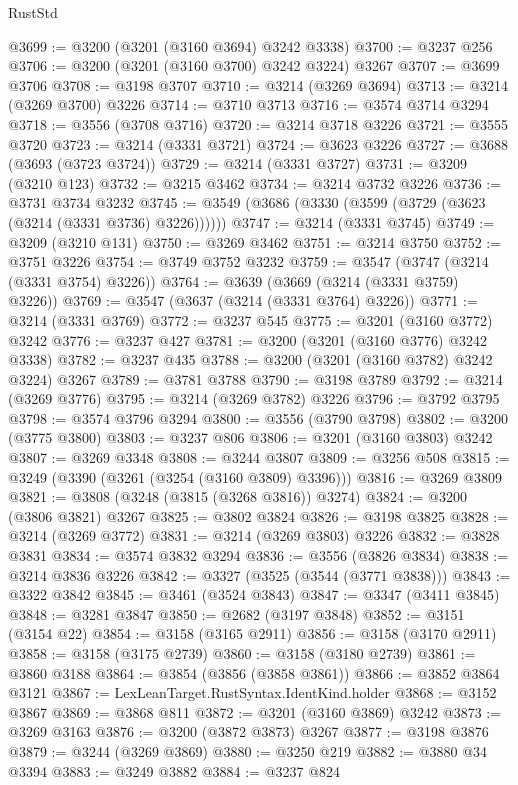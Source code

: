 \begin{lexlean}{RustStd}
\begin{coremodule}
{\begin{coremodule}
{{{{{{{{{{{{{{{{{{{{{{{{{@3699 := @3200 (@3201 (@3160 @3694) @3242 @3338)
@3700 := @3237 @256
@3706 := @3200 (@3201 (@3160 @3700) @3242 @3224) @3267
@3707 := @3699 @3706
@3708 := @3198 @3707
@3710 := @3214 (@3269 @3694)
@3713 := @3214 (@3269 @3700) @3226
@3714 := @3710 @3713
@3716 := @3574 @3714 @3294
@3718 := @3556 (@3708 @3716)
@3720 := @3214 @3718 @3226
@3721 := @3555 @3720
@3723 := @3214 (@3331 @3721)
@3724 := @3623 @3226
@3727 := @3688 (@3693 (@3723 @3724))
@3729 := @3214 (@3331 @3727)
@3731 := @3209 (@3210 @123)
@3732 := @3215 @3462
@3734 := @3214 @3732 @3226
@3736 := @3731 @3734 @3232
@3745 := @3549 (@3686 (@3330 (@3599 (@3729 (@3623 (@3214 (@3331 @3736) @3226))))))
@3747 := @3214 (@3331 @3745)
@3749 := @3209 (@3210 @131)
@3750 := @3269 @3462
@3751 := @3214 @3750
@3752 := @3751 @3226
@3754 := @3749 @3752 @3232
@3759 := @3547 (@3747 (@3214 (@3331 @3754) @3226))
@3764 := @3639 (@3669 (@3214 (@3331 @3759) @3226))
@3769 := @3547 (@3637 (@3214 (@3331 @3764) @3226))
@3771 := @3214 (@3331 @3769)
@3772 := @3237 @545
@3775 := @3201 (@3160 @3772) @3242
@3776 := @3237 @427
@3781 := @3200 (@3201 (@3160 @3776) @3242 @3338)
@3782 := @3237 @435
@3788 := @3200 (@3201 (@3160 @3782) @3242 @3224) @3267
@3789 := @3781 @3788
@3790 := @3198 @3789
@3792 := @3214 (@3269 @3776)
@3795 := @3214 (@3269 @3782) @3226
@3796 := @3792 @3795
@3798 := @3574 @3796 @3294
@3800 := @3556 (@3790 @3798)
@3802 := @3200 (@3775 @3800)
@3803 := @3237 @806
@3806 := @3201 (@3160 @3803) @3242
@3807 := @3269 @3348
@3808 := @3244 @3807
@3809 := @3256 @508
@3815 := @3249 (@3390 (@3261 (@3254 (@3160 @3809) @3396)))
@3816 := @3269 @3809
@3821 := @3808 (@3248 (@3815 (@3268 @3816)) @3274)
@3824 := @3200 (@3806 @3821) @3267
@3825 := @3802 @3824
@3826 := @3198 @3825
@3828 := @3214 (@3269 @3772)
@3831 := @3214 (@3269 @3803) @3226
@3832 := @3828 @3831
@3834 := @3574 @3832 @3294
@3836 := @3556 (@3826 @3834)
@3838 := @3214 @3836 @3226
@3842 := @3327 (@3525 (@3544 (@3771 @3838)))
@3843 := @3322 @3842
@3845 := @3461 (@3524 @3843)
@3847 := @3347 (@3411 @3845)
@3848 := @3281 @3847
@3850 := @2682 (@3197 @3848)
@3852 := @3151 (@3154 @22)
@3854 := @3158 (@3165 @2911)
@3856 := @3158 (@3170 @2911)
@3858 := @3158 (@3175 @2739)
@3860 := @3158 (@3180 @2739)
@3861 := @3860 @3188
@3864 := @3854 (@3856 (@3858 @3861))
@3866 := @3852 @3864 @3121
@3867 := LexLeanTarget.RustSyntax.IdentKind.holder
@3868 := @3152 @3867
@3869 := @3868 @811
@3872 := @3201 (@3160 @3869) @3242
@3873 := @3269 @3163
@3876 := @3200 (@3872 @3873) @3267
@3877 := @3198 @3876
@3879 := @3244 (@3269 @3869)
@3880 := @3250 @219
@3882 := @3880 @34 @3394
@3883 := @3249 @3882
@3884 := @3237 @824
}}}}}}}}}}}}}}}}}}}}}}}}}
\end{coremodule}}
\end{coremodule}
\end{lexlean}
